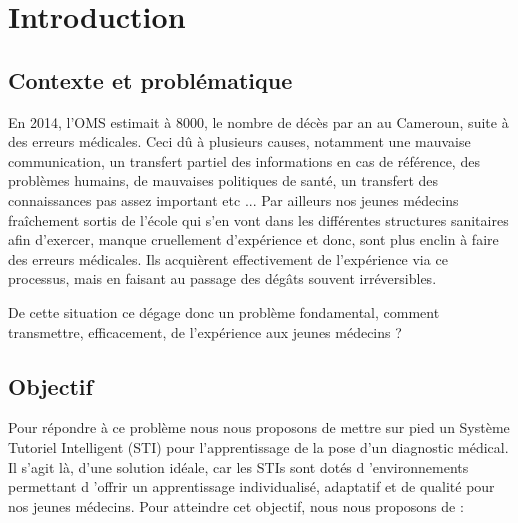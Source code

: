 
\chapter{Introduction}
\label{chp:intro}


\section{Contexte et problématique}

En 2014, l'OMS estimait à $8000$, le nombre de décès par an au Cameroun, suite à des erreurs médicales. Ceci dû à plusieurs causes, notamment une mauvaise communication, un transfert partiel des informations en cas de référence, des problèmes humains, de mauvaises politiques de santé, un transfert des connaissances pas assez important etc ...  Par ailleurs nos jeunes médecins fraîchement sortis de l'école qui s'en vont dans les différentes structures sanitaires afin d'exercer, manque cruellement d'expérience et donc, sont plus enclin à faire des erreurs médicales. Ils acquièrent effectivement de l'expérience via ce processus, mais en faisant au passage des dégâts souvent irréversibles.


De cette situation ce dégage donc un problème fondamental, comment transmettre, efficacement, de l'expérience aux jeunes médecins ? 

\newpage

\section{Objectif}
Pour répondre à ce problème nous nous proposons de mettre sur pied un Système Tutoriel Intelligent (STI) pour l'apprentissage de la pose d'un diagnostic médical. Il s'agit là, d'une solution idéale, car les STIs sont dotés d 'environnements permettant d 'offrir un apprentissage individualisé, adaptatif et de qualité pour nos jeunes médecins. Pour atteindre cet objectif, nous nous proposons de :

